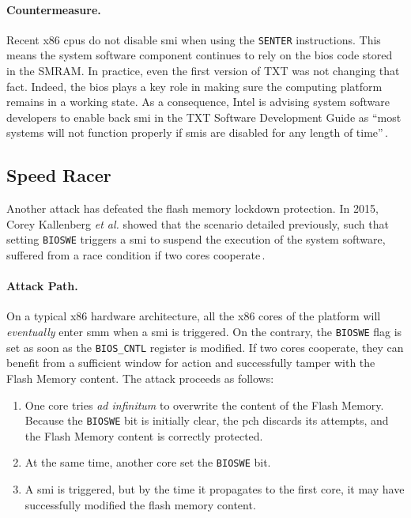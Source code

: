 \paragraph{Countermeasure.}
%
Recent x86 \acp{cpu} do not disable \ac{smi} when using the \texttt{SENTER}
instructions. 
%
This means the system software component continues to rely on the \ac{bios} code
stored in the SMRAM.
%
In practice, even the first version of TXT was not changing that fact.
%
Indeed, the \ac{bios} plays a key role in making sure the computing platform
remains in a working state.
%
As a consequence, Intel is advising system software developers to enable back
\ac{smi} in the TXT Software Development Guide as ``most systems will not
function properly if \acp{smi} are disabled for any length of
time''\,\cite{intel2015txt}. 

\subsection{Speed Racer}
\label{subsec:usecase:hse:speed}

Another attack has defeated the flash memory lockdown protection.
%
In 2015, Corey Kallenberg \emph{et al.} showed that the scenario detailed
previously, such that setting \texttt{BIOSWE} triggers a \ac{smi} to suspend the
execution of the system software, suffered from a race condition if two cores
cooperate\,\cite{kallenberg2015racecondition}.

\paragraph{Attack Path.}
%
On a typical x86 hardware architecture, all the x86 cores of the platform will
\emph{eventually} enter \ac{smm} when a \ac{smi} is triggered.
%
On the contrary, the \texttt{BIOSWE} flag is set as soon as the
\texttt{BIOS\_CNTL} register is modified.
%
If two cores cooperate, they can benefit from a sufficient window for action and
successfully tamper with the Flash Memory content.
%
The attack proceeds as follows:

\begin{enumerate}
\item One core tries \emph{ad infinitum} to overwrite the content of the Flash
  Memory.
  Because the \texttt{BIOSWE} bit is initially clear, the \ac{pch} discards its
  attempts, and the Flash Memory content is correctly protected.
%
\item At the same time, another core set the \texttt{BIOSWE} bit.
%
\item A \ac{smi} is triggered, but by the time it propagates to the first core,
  it may have successfully modified the flash memory content.
%
\end{enumerate}

